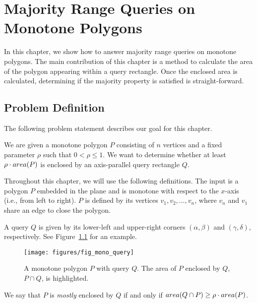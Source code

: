 \chapter{Majority Range Queries on Monotone Polygons}
\label{:monotonep}


In this chapter, we show how to answer majority range queries on monotone polygons. The main contribution of this chapter is a method to calculate the area of the polygon appearing within a query rectangle. Once the enclosed area is calculated, determining if the majority property is satisfied is straight-forward.


\section{Problem Definition}
\label{:monotonep:problem-definition}

The following problem statement describes our goal for this chapter.

\begin{problem}
We are given a monotone polygon $P$ consisting of $n$ vertices and a fixed parameter $\rho$ such that $0 < \rho \leq 1$. We want to determine whether at least $\rho \cdot area(P)$ is enclosed by an axis-parallel query rectangle $Q$.
\end{problem}

Throughout this chapter, we will use the following definitions. The input is a polygon $P$ embedded in the plane and is monotone with respect to the $x$-axis (i.e., from left to right). $P$ is defined by its vertices $v_1, v_2, \ldots, v_n$, where $v_n$ and $v_1$ share an edge to close the polygon. 

A query $Q$ is given by its lower-left and upper-right corners $(\alpha, \beta)$ and $(\gamma, \delta)$, respectively. See Figure~\ref{fig:monotonep:query-example} for an example.

\begin{figure}[t]
\begin{center}
  \texttt{[image: figures/fig\_mono\_query]}
  \caption[A monotone polygon $P$ with query $Q$.]{A monotone polygon $P$ with query $Q$. The area of $P$ enclosed by $Q$, $P \cap Q$, is highlighted.}
  \label{fig:monotonep:query-example}
\end{center}
\end{figure}

We say that $P$ is \emph{mostly} enclosed by $Q$ if and only if $area(Q \cap P) \geq \rho \cdot area(P)$.


